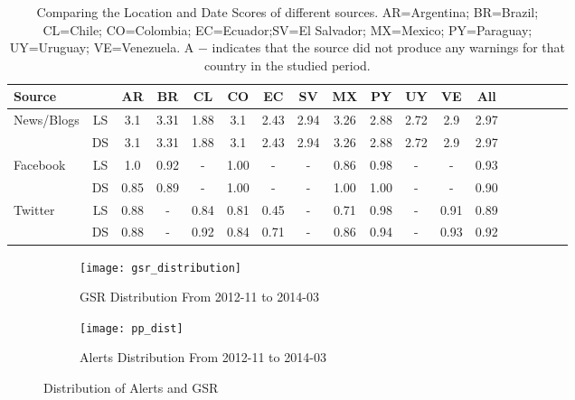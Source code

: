 \begin{table*} %
\centering
\caption{Comparing the Location and Date Scores of different sources. AR=Argentina; BR=Brazil; CL=Chile; CO=Colombia; EC=Ecuador;SV=El Salvador; MX=Mexico; PY=Paraguay; UY=Uruguay; VE=Venezuela. A $-$ indicates that the source did not produce any warnings for that country in the studied period.}
\vspace{-2mm}
\label{tb:modelwisecomparison}
\begin{tabular}{||l|*{17}{c|}}
\hline
Source& & AR & BR & CL & CO & EC & SV & MX & PY & UY & VE & All\\
\hline
\multirow{2}{*}{News/Blogs} &LS &3.1&3.31&1.88&3.1&2.43&2.94&3.26&2.88&2.72&2.9&2.97\\
                            &DS&3.1&3.31&1.88&3.1&2.43&2.94&3.26&2.88&2.72&2.9&2.97\\
\hline
\multirow{2}{*}{Facebook} &LS &1.0&0.92&-&1.00&-&-&0.86&0.98&-&-&0.93\\
                          &DS&0.85&0.89&-&1.00&-&-&1.00&1.00&-&-&0.90\\
\hline
\multirow{2}{*}{Twitter} &LS &0.88&-&0.84&0.81&0.45&-&0.71&0.98&-&0.91&0.89\\
                         &DS&0.88&-&0.92&0.84&0.71&-&0.86&0.94&-&0.93&0.92\\
\hline
\end{tabular}
\vspace{-4mm}
\end{table*}


\begin{figure*}
\centering
\begin{subfigure}{\columnwidth}
  \centering
  \texttt{[image: gsr\_distribution]}
  \caption{GSR Distribution From 2012-11 to 2014-03}
  \label{fig:gsrdistribution}
\end{subfigure}%
\begin{subfigure}{\columnwidth}
  \centering
  \texttt{[image: pp\_dist]}
  \caption{Alerts Distribution From 2012-11 to 2014-03}
  \label{fig:ppdistribution}
\end{subfigure}
\caption{Distribution of Alerts and GSR}
\label{fig:distribution}
\end{figure*}

